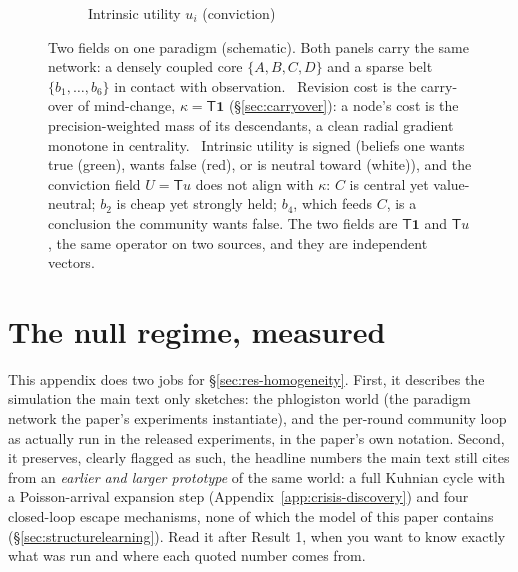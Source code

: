 \documentclass[runningheads]{llncs}
\newcommand{\Top}{\mathsf{T}}          %
\newcommand{\bone}{\mathbf{1}}         %
\begin{document}
\begin{figure}[h!]
\begin{subfigure}{0.49\textwidth}
\caption{Intrinsic utility $u_i$ (conviction)}
\label{sub:util}
\end{subfigure}
\caption{Two fields on one paradigm (schematic). Both panels carry the same network: a densely
coupled core $\{A,B,C,D\}$ and a sparse belt $\{b_1,\dots,b_6\}$ in contact with observation.
~Revision cost is the carry-over of mind-change, $\kappa=\Top\bone$
(\S\ref{sec:carryover}): a node's cost is the precision-weighted mass of its descendants, a clean radial
gradient monotone in centrality. ~Intrinsic utility is signed (beliefs one wants
true (green), wants false (red), or is neutral toward (white)), and the conviction field
$U=\Top u$ does not align with $\kappa$: $C$ is central yet value-neutral; $b_2$ is cheap yet strongly
held; $b_4$, which feeds $C$, is a conclusion the community wants false. The two fields are
$\Top\bone$ and $\Top u$, the same operator on two sources, and they are independent vectors.}
\label{fig:twofields}
\end{figure}

\section{The null regime, measured}
\label{app:null}

This appendix does two jobs for \S\ref{sec:res-homogeneity}. First, it describes the
simulation the main text only sketches: the phlogiston world (the paradigm network the
paper's experiments instantiate), and the per-round community loop as actually run in the
released experiments, in the paper's own notation. Second, it preserves, clearly flagged as
such, the headline numbers the main text still cites from an \emph{earlier and larger
prototype} of the same world: a full Kuhnian cycle with a Poisson-arrival expansion step
(Appendix~\ref{app:crisis-discovery}) and four closed-loop escape mechanisms, none of which
the model of this paper contains (\S\ref{sec:structurelearning}). Read it after Result 1,
when you want to know exactly what was run and where each quoted number comes from.
\end{document}
